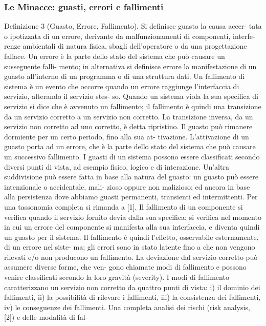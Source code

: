 \documentclass[14pt]{extarticle}
\begin{document}
\subsubsection{Le Minacce: guasti, errori e fallimenti}
Definizione 3 (Guasto, Errore, Fallimento). Si definisce guasto la causa accer-
tata o ipotizzata di un errore, derivante da malfunzionamenti di componenti, interfe-
renze ambientali di natura fisica, sbagli dell’operatore o da una progettazione fallace.
Un errore è la parte dello stato del sistema che può causare un susseguente falli-
mento; in alternativa si definisce errore la manifestazione di un guasto all’interno di
un programma o di una struttura dati. Un fallimento di sistema è un evento che
occorre quando un errore raggiunge l’interfaccia di servizio, alterando il servizio stes-
so. Quando un sistema viola la sua specifica di servizio si dice che è avvenuto un
fallimento; il fallimento è quindi una transizione da un servizio corretto a un servizio
non corretto. La transizione inversa, da un servizio non corretto ad uno corretto, è
detta ripristino.
Il guasto può rimanere dormiente per un certo periodo, fino alla sua at-
tivazione. L’attivazione di un guasto porta ad un errore, che è la parte dello
stato del sistema che può causare un successivo fallimento. I guasti di un
sistema possono essere classificati secondo diversi punti di vista, ad esempio
fisico, logico e di interazione. Un’altra suddivisione può essere fatta in base
alla natura del guasto: un guasto può essere intenzionale o accidentale, mali-
zioso oppure non malizioso; ed ancora in base alla persistenza dove abbiamo
guasti permanenti, transienti ed intermittenti. Per una tassonomia completa
si rimanda a [1].
Il fallimento di un componente si verifica quando il servizio fornito devia
dalla sua specifica: si verifica nel momento in cui un errore del componente
si manifesta alla sua interfaccia, e diventa quindi un guasto per il sistema. Il
fallimento è quindi l’effetto, osservabile esternamente, di un errore nel siste-
ma; gli errori sono in stato latente fino a che non vengono rilevati e/o non
producono un fallimento.
La deviazione dal servizio corretto può assumere diverse forme, che ven-
gono chiamate modi di fallimento e possono venire classificati secondo la loro
gravità (severity). I modi di fallimento caratterizzano un servizio non corretto
da quattro punti di vista:
i) il dominio dei fallimenti,
ii) la possibilità di rilevare i fallimenti,
iii) la consistenza dei fallimenti,
iv) le conseguenze dei fallimenti.
Una completa analisi dei rischi (risk analysis, [2]) e delle modalità di fal-
\end{document}
